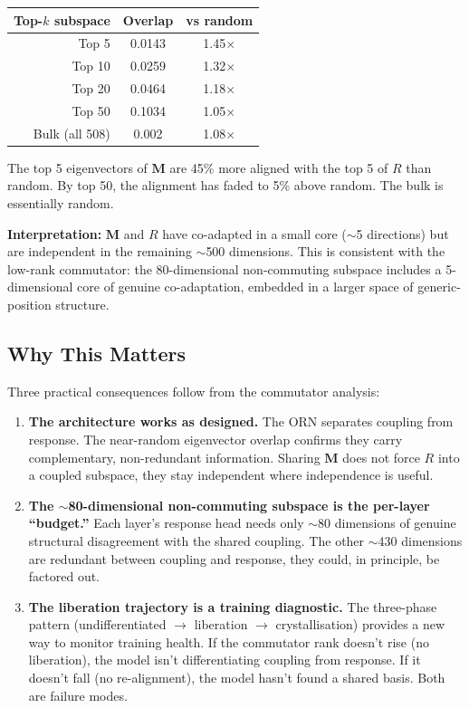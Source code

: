 \documentclass[11pt, a4paper]{article}
\newcommand{\M}{\mathbf{M}}
\theoremstyle{remark}
\begin{document}
\begin{center}\small
\begin{tabular}{rcc}
\toprule
\textbf{Top-$k$ subspace} & \textbf{Overlap} & \textbf{vs random} \\
\midrule
Top 5 & 0.0143 & 1.45$\times$ \\
Top 10 & 0.0259 & 1.32$\times$ \\
Top 20 & 0.0464 & 1.18$\times$ \\
Top 50 & 0.1034 & 1.05$\times$ \\
Bulk (all 508) & 0.002 & 1.08$\times$ \\
\bottomrule
\end{tabular}
\end{center}

The top 5 eigenvectors of $\M$ are 45\% more aligned with the top 5 of $R$ than random.
By top 50, the alignment has faded to 5\% above random.
The bulk is essentially random.

\textbf{Interpretation:} $\M$ and $R$ have co-adapted in a small core ($\sim$5 directions) but are independent in the remaining $\sim$500 dimensions.
This is consistent with the low-rank commutator: the 80-dimensional non-commuting subspace includes a 5-dimensional core of genuine co-adaptation, embedded in a larger space of generic-position structure.

\subsection{Why This Matters}

Three practical consequences follow from the commutator analysis:

\begin{enumerate}[leftmargin=*]
\item \textbf{The architecture works as designed.} The ORN separates coupling from response. The near-random eigenvector overlap confirms they carry complementary, non-redundant information. Sharing $\M$ does not force $R$ into a coupled subspace, they stay independent where independence is useful.

\item \textbf{The $\sim$80-dimensional non-commuting subspace is the per-layer ``budget.''} Each layer's response head needs only $\sim$80 dimensions of genuine structural disagreement with the shared coupling. The other $\sim$430 dimensions are redundant between coupling and response, they could, in principle, be factored out.

\item \textbf{The liberation trajectory is a training diagnostic.} The three-phase pattern (undifferentiated $\to$ liberation $\to$ crystallisation) provides a new way to monitor training health. If the commutator rank doesn't rise (no liberation), the model isn't differentiating coupling from response. If it doesn't fall (no re-alignment), the model hasn't found a shared basis. Both are failure modes.
\end{enumerate}
\end{document}
